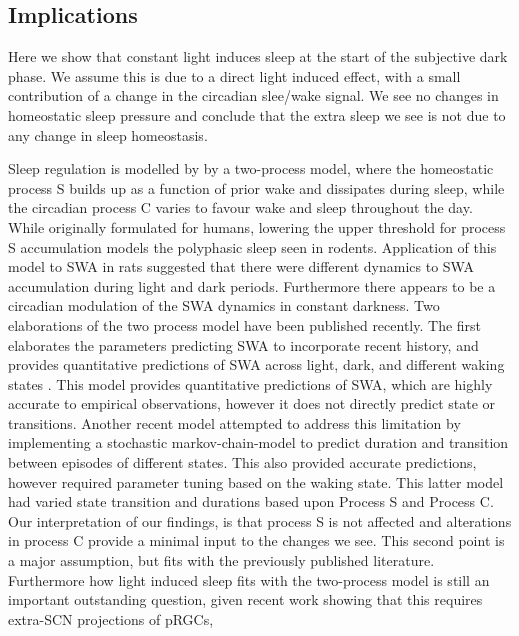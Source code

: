 \subsection{Implications}
Here we show that constant light induces sleep at the 
start of the subjective dark phase.
We assume this is due to a direct light induced effect, with
a small contribution of a change in the circadian slee/wake signal.
We see no changes in homeostatic sleep pressure and conclude 
that the extra sleep we see is not due to any change in sleep
homeostasis.

Sleep regulation is modelled by by a two-process model\cite{borbely_two-process_2016},
where the homeostatic process S builds up as a function of prior wake 
and dissipates during sleep, while the circadian process C varies
to favour wake and sleep throughout the day. 
While originally formulated for humans, lowering the upper threshold 
for process S accumulation models the polyphasic sleep seen in
rodents\cite{daan_timing_1984}.
Application of this model to SWA in rats suggested that there 
were different dynamics to SWA accumulation during 
light and dark periods\cite{vyazovskiy_sleep_2007}.
Furthermore there appears to be a circadian modulation
of the SWA dynamics in constant darkness\cite{deboer_sleep_2009}. 
Two elaborations of the two process model have been 
published recently.
The first elaborates the parameters predicting SWA to incorporate
recent history, and provides quantitative predictions of 
SWA across light, dark, and different waking states
\cite{guillaumin_cortical_2018}.
This model provides quantitative predictions of SWA, which are highly 
accurate to empirical observations, however it does not directly 
predict state or transitions.
Another recent model attempted to address this limitation by 
implementing a stochastic markov-chain-model to predict 
duration and transition between
episodes of different states\cite{rempe_mathematical_2018}.
This also provided accurate predictions, however required parameter 
tuning based on the waking state.
This latter model had varied state transition and durations
based upon Process S and Process C. 
Our interpretation of our findings, is that process S is not affected
and alterations in process C provide a minimal input to the changes
we see.
This second point is a major assumption, but fits with the previously
published literature\cite{coomans_detrimental_2013}.
Furthermore how light induced sleep fits with the two-process model
is still an important outstanding question, given recent work
showing that this requires extra-SCN projections of pRGCs, 
